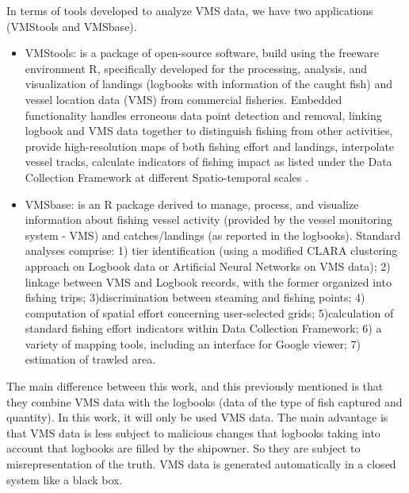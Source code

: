 In terms of tools developed to analyze VMS data, we have two applications (VMStools and VMSbase).
\begin{itemize}
\item VMStools: is a package of open-source software, build using the freeware environment R, specifically developed for the processing, analysis, and visualization of landings (logbooks with information of the caught fish) and vessel location data (VMS) from commercial fisheries. Embedded functionality handles erroneous data point detection and removal, linking logbook and VMS data together to distinguish fishing from other activities, provide high-resolution maps of both fishing effort and landings, interpolate vessel tracks, calculate indicators of fishing impact as listed under the Data Collection Framework at different Spatio-temporal scales \cite{DeporteVMStools}.


\item VMSbase: is an R package derived to manage, process, and visualize information about fishing vessel activity (provided by the vessel monitoring system - VMS) and catches/landings (as reported in the logbooks).
Standard analyses comprise: 1) tier identification (using a modified CLARA clustering approach on Logbook data or Artificial Neural
Networks on VMS data); 2) linkage between VMS and Logbook records, with the former organized into fishing trips; 3)discrimination between steaming and fishing points; 4) computation of spatial effort concerning user-selected grids; 5)calculation of standard fishing effort indicators within Data Collection Framework; 6) a variety of mapping tools, including an interface for Google viewer; 7) estimation of trawled area\cite{RussoVMSbase}.
\end{itemize}


The main difference between this work, and this previously mentioned is that they combine VMS data with the logbooks (data of the type of fish captured and quantity).
In this work, it will only be used VMS data. 
The main advantage is that VMS data is less subject to malicious changes that logbooks taking into account that logbooks are filled by the shipowner. So they are subject to misrepresentation of the truth. VMS data is generated automatically in a closed system like a black box. 


